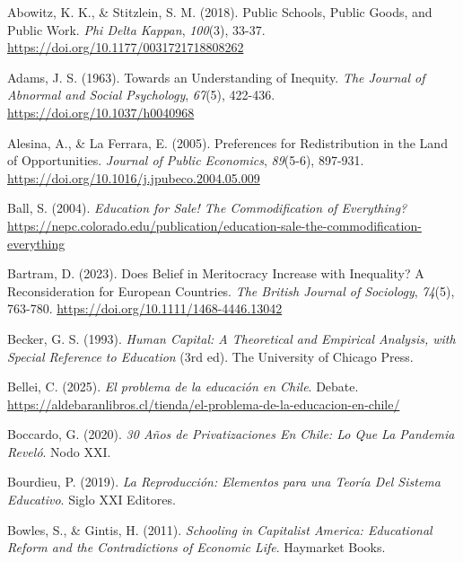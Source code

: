 \documentclass[
  spanish,
  a4paper,
  oneside]{scrbook}
\newlength{\cslhangindent}
\newenvironment{CSLReferences}[2] %
 {\begin{list}{}{%
  \setlength{\itemindent}{0pt}
  \setlength{\leftmargin}{0pt}
  \setlength{\parsep}{0pt}
  \ifodd #1
   \setlength{\leftmargin}{\cslhangindent}
   \setlength{\itemindent}{-1\cslhangindent}
  \fi
  \setlength{\itemsep}{#2\baselineskip}}}
 {\end{list}}
\begin{document}
\label{refs}
\begin{CSLReferences}{1}{0}
Abowitz, K. K., \& Stitzlein, S. M. (2018). Public Schools, Public
Goods, and Public Work. \emph{Phi Delta Kappan}, \emph{100}(3), 33-37.
\url{https://doi.org/10.1177/0031721718808262}

Adams, J. S. (1963). Towards an Understanding of Inequity. \emph{The
Journal of Abnormal and Social Psychology}, \emph{67}(5), 422-436.
\url{https://doi.org/10.1037/h0040968}

Alesina, A., \& La Ferrara, E. (2005). Preferences for Redistribution in
the Land of Opportunities. \emph{Journal of Public Economics},
\emph{89}(5-6), 897-931.
\url{https://doi.org/10.1016/j.jpubeco.2004.05.009}

Ball, S. (2004). \emph{Education for Sale! The Commodification of
Everything?}
\url{https://nepc.colorado.edu/publication/education-sale-the-commodification-everything}

Bartram, D. (2023). Does Belief in Meritocracy Increase with Inequality?
A Reconsideration for European Countries. \emph{The British Journal of
Sociology}, \emph{74}(5), 763-780.
\url{https://doi.org/10.1111/1468-4446.13042}

Becker, G. S. (1993). \emph{Human Capital: A Theoretical and Empirical
Analysis, with Special Reference to Education} (3rd ed). The University
of Chicago Press.

Bellei, C. (2025). \emph{El problema de la educación en Chile}. Debate.
\url{https://aldebaranlibros.cl/tienda/el-problema-de-la-educacion-en-chile/}

Boccardo, G. (2020). \emph{30 Años de Privatizaciones En Chile: Lo Que
La Pandemia Reveló}. Nodo XXI.

Bourdieu, P. (2019). \emph{La Reproducción: Elementos para una Teoría
Del Sistema Educativo}. Siglo XXI Editores.

Bowles, S., \& Gintis, H. (2011). \emph{Schooling in Capitalist America:
Educational Reform and the Contradictions of Economic Life}. Haymarket
Books.


\end{CSLReferences}
\end{document}
